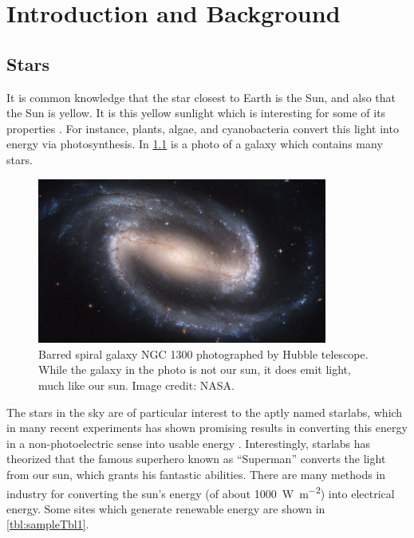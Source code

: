 
\chapter{Introduction and Background}

\section{Stars}

It is common knowledge that the star closest to Earth is the Sun, and also that the Sun is yellow. It is this yellow sunlight which is interesting for some of its properties \cite{scholes2011lessons}. For instance, plants, algae, and cyanobacteria convert this light into energy via photosynthesis. In \ref{fig:firstFig} is a photo of a galaxy which contains many stars.

\begin{figure}[ht]
    \centering
	\includegraphics[width=0.85\textwidth]{figures/sampleFig1.jpg}
	\caption[Barred spiral galaxy NGC 1300]{Barred spiral galaxy NGC 1300 photographed by Hubble telescope. While the galaxy in the photo is not our sun, it does emit light, much like our sun. Image credit: NASA.}
	\label{fig:firstFig}
\end{figure}

The stars in the sky are of particular interest to the aptly named \gls{starlabs}, which in many recent experiments has shown promising results in converting this energy in a non-photoelectric sense into usable energy \cite{allen2019fast}. Interestingly, \gls{starlabs} has theorized that the famous superhero known as ``Superman'' converts the light from our sun, which grants his fantastic abilities. There are many methods in industry for converting the sun's energy (of about \SI{1000}{\watt\per\meter\squared}) into electrical energy. Some sites which generate renewable energy are shown in \ref{tbl:sampleTbl1}.

\begin{table}[ht]
\centering
\caption[Selected renewable energy installations]{Renewable energy installations located in a few different countries}
\label{tbl:sampleTbl1}
\end{table}